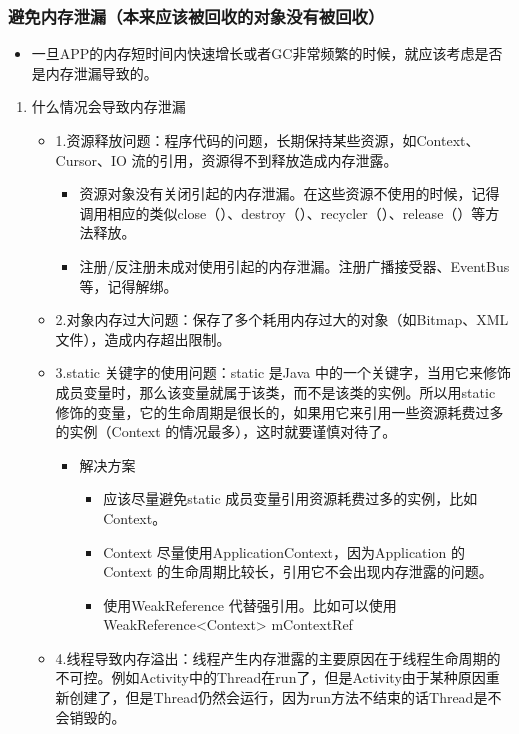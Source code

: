 \documentclass[9pt, b5paper]{article}
\begin{document}
\subsubsection{避免内存泄漏（本来应该被回收的对象没有被回收）}
\label{sec-1-1-7}
\begin{itemize}
\item 一旦APP的内存短时间内快速增长或者GC非常频繁的时候，就应该考虑是否是内存泄漏导致的。
\end{itemize}
\begin{enumerate}
\item 什么情况会导致内存泄漏
\label{sec-1-1-7-1}
\begin{itemize}
\item 1.资源释放问题：程序代码的问题，长期保持某些资源，如Context、Cursor、IO 流的引用，资源得不到释放造成内存泄露。 
\begin{itemize}
\item 资源对象没有关闭引起的内存泄漏。在这些资源不使用的时候，记得调用相应的类似close（）、destroy（）、recycler（）、release（）等方法释放。
\item 注册/反注册未成对使用引起的内存泄漏。注册广播接受器、EventBus等，记得解绑。
\end{itemize}
\item 2.对象内存过大问题：保存了多个耗用内存过大的对象（如Bitmap、XML 文件），造成内存超出限制。
\item 3.static 关键字的使用问题：static 是Java 中的一个关键字，当用它来修饰成员变量时，那么该变量就属于该类，而不是该类的实例。所以用static 修饰的变量，它的生命周期是很长的，如果用它来引用一些资源耗费过多的实例（Context 的情况最多），这时就要谨慎对待了。
\begin{itemize}
\item 解决方案
\begin{itemize}
\item 应该尽量避免static 成员变量引用资源耗费过多的实例，比如Context。
\item Context 尽量使用ApplicationContext，因为Application 的Context 的生命周期比较长，引用它不会出现内存泄露的问题。
\item 使用WeakReference 代替强引用。比如可以使用WeakReference<Context> mContextRef
\end{itemize}
\end{itemize}
\item 4.线程导致内存溢出：线程产生内存泄露的主要原因在于线程生命周期的不可控。例如Activity中的Thread在run了，但是Activity由于某种原因重新创建了，但是Thread仍然会运行，因为run方法不结束的话Thread是不会销毁的。

\end{itemize}
\end{enumerate}
\end{document}
